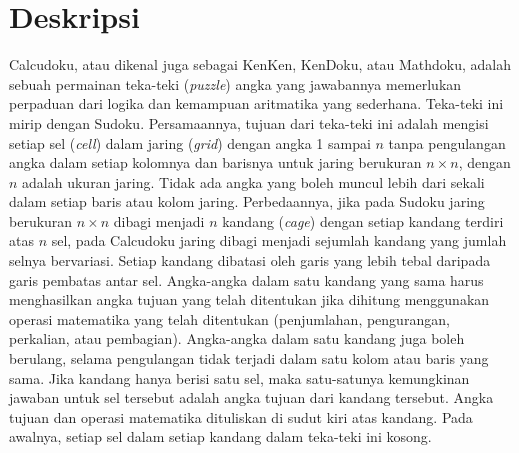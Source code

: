 \documentclass[a4paper,twoside]{article}
\begin{document}
\title{\@judultopik}
\author{\nama \textendash \@npm} 

\newcommand{\nama}{Michael Adrian}
\newcommand{\@npm}{2013730039}
\newcommand{\@judultopik}{Perbandingan Algoritma Backtracking dengan Algoritma Hybrid Genetic untuk Menyelesaikan Permainan Calcudoku} %
\newcommand{\jumpemb}{1} %
\newcommand{\tanggal}{08/09/2016}


\maketitle


\section{Deskripsi}

Calcudoku, atau dikenal juga sebagai KenKen, KenDoku, atau Mathdoku, adalah sebuah permainan teka-teki (\textit{puzzle}) angka yang jawabannya memerlukan perpaduan dari logika dan kemampuan aritmatika yang sederhana. Teka-teki ini mirip dengan Sudoku. Persamaannya, tujuan dari teka-teki ini adalah mengisi setiap sel (\textit{cell}) dalam jaring (\textit{grid}) dengan angka 1 sampai \begin{math}n\end{math} tanpa pengulangan angka dalam setiap kolomnya dan barisnya untuk jaring berukuran \begin{math}n \times n\end{math}, dengan \begin{math}n\end{math} adalah ukuran jaring. Tidak ada angka yang boleh muncul lebih dari sekali dalam setiap baris atau kolom jaring. Perbedaannya, jika pada Sudoku jaring berukuran \begin{math}n \times n\end{math} dibagi menjadi \begin{math}n\end{math} kandang (\textit{cage}) dengan setiap kandang terdiri atas \begin{math}n\end{math} sel, pada Calcudoku jaring dibagi menjadi sejumlah kandang yang jumlah selnya bervariasi. Setiap kandang dibatasi oleh garis yang lebih tebal daripada garis pembatas antar sel. Angka-angka dalam satu kandang yang sama harus menghasilkan angka tujuan yang telah ditentukan jika dihitung menggunakan operasi matematika yang telah ditentukan (penjumlahan, pengurangan, perkalian, atau pembagian). Angka-angka dalam satu kandang juga boleh berulang, selama pengulangan tidak terjadi dalam satu kolom atau baris yang sama. Jika kandang hanya berisi satu sel, maka satu-satunya kemungkinan jawaban untuk sel tersebut adalah angka tujuan dari kandang tersebut. Angka tujuan dan operasi matematika dituliskan di sudut kiri atas kandang. Pada awalnya, setiap sel dalam setiap kandang dalam teka-teki ini kosong. \cite{Fahda, JohannaLukasSaputra}
\end{document}
